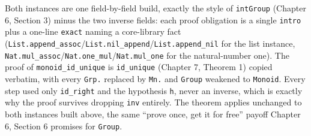 Both instances are one field-by-field build, exactly the style of \texttt{intGroup} (Chapter 6, Section 3) minus the two inverse fields: each proof obligation is a single \texttt{intro} plus a one-line \texttt{exact} naming a core-library fact (\texttt{List.append\_\allowbreak{}assoc}/\texttt{List.nil\_\allowbreak{}append}/\texttt{List.append\_\allowbreak{}nil} for the list instance, \texttt{Nat.mul\_\allowbreak{}assoc}/\texttt{Nat.one\_\allowbreak{}mul}/\texttt{Nat.mul\_\allowbreak{}one} for the natural-number one). The proof of \texttt{monoid\_\allowbreak{}id\_\allowbreak{}unique} is \texttt{id\_\allowbreak{}unique} (Chapter 7, Theorem 1) copied verbatim, with every \texttt{Grp.} replaced by \texttt{Mn.} and \texttt{Group} weakened to \texttt{Monoid}. Every step used only \texttt{id\_\allowbreak{}right} and the hypothesis \texttt{h}, never an inverse, which is exactly why the proof survives dropping \texttt{inv} entirely. The theorem applies unchanged to both instances built above, the same ``prove once, get it for free'' payoff Chapter 6, Section 6 promises for \texttt{Group}.
